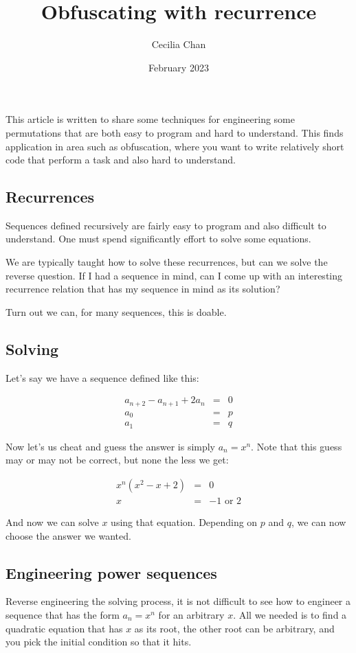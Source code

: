 \documentclass{article}
\title{Obfuscating with recurrence}
\author{Cecilia Chan}
\date{February 2023}
\begin{document}
\maketitle
This article is written to share some techniques for engineering some permutations that are both easy to program and hard to understand. This finds application in area such as obfuscation, where you want to write relatively short code that perform a task and also hard to understand.

\subsection*{Recurrences}
Sequences defined recursively are fairly easy to program and also difficult to understand. One must spend significantly effort to solve some equations.

We are typically taught how to solve these recurrences, but can we solve the reverse question. If I had a sequence in mind, can I come up with an interesting recurrence relation that has my sequence in mind as its solution?

Turn out we can, for many sequences, this is doable.

\subsection*{Solving}
Let's say we have a sequence defined like this:

\begin{eqnarray*}
  a_{n+2} - a_{n+1} + 2a_n &=& 0 \\
  a_0 &=& p \\
  a_1 &=& q
\end{eqnarray*}

Now let's us cheat and guess the answer is simply $ a_n = x^n $. Note that this guess may or may not be correct, but none the less we get:

\begin{eqnarray*}
  x^n(x^2 - x + 2) &=& 0 \\
  x &=& -1 \text{ or } 2
\end{eqnarray*}

And now we can solve $ x $ using that equation. Depending on $ p $ and $ q $, we can now choose the answer we wanted.

\subsection*{Engineering power sequences}
Reverse engineering the solving process, it is not difficult to see how to engineer a sequence that has the form $ a_n = x^n $ for an arbitrary $ x $. All we needed is to find a quadratic equation that has $ x $ as its root, the other root can be arbitrary, and you pick the initial condition so that it hits.
\end{document}

